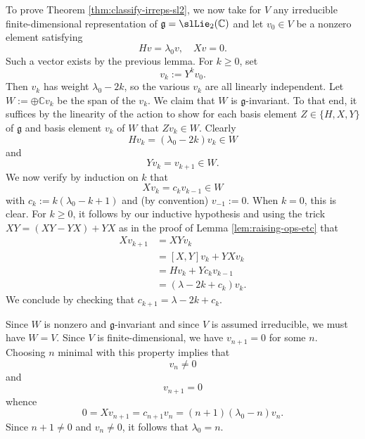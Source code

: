 \documentclass[reqno]{amsart} 
\begin{document}
To prove Theorem \ref{thm:classify-irreps-sl2},
we now take for $V$ any irreducible finite-dimensional
representation
of $\mathfrak{g} = \slLie_2(\mathbb{C})$
and let $v_0 \in V$ be a nonzero element
satisfying
\begin{equation*}
  H v = \lambda_0 v,
  \quad X v = 0.
\end{equation*}
Such a vector exists by the previous lemma.
For $k \geq 0$,
set
\begin{equation*}
  v_k := Y^k v_0.
\end{equation*}
Then $v_k$ has weight $\lambda_0 - 2k$,
so the various $v_k$ are all linearly independent.
Let $W := \oplus \mathbb{C} v_k$ be the span of the $v_k$.
We claim that $W$ is $\mathfrak{g}$-invariant.
To that end, it suffices by the linearity
of the action to show
for each basis element $Z \in \{H,X,Y\}$ of $\mathfrak{g}$
and basis element $v_k$ of $W$
that $Z v_k \in W$.
Clearly
\begin{equation*}
  H v_k = (\lambda_0 - 2 k) v_k \in W
\end{equation*}
and
\begin{equation*}
  Y v_k = v_{k+1} \in W.
\end{equation*}
We now verify by induction on $k$ that
\begin{equation*}
  X v_k = c_k v_{k-1} \in W
\end{equation*}
with $c_k := k(\lambda_0 - k + 1)$
and (by convention) $v_{-1} := 0$.
When $k = 0$, this is clear.
For $k \geq 0$,
it follows by our inductive hypothesis
and using the trick $X Y = (X Y - Y X) + Y X$
as in  the proof of Lemma \ref{lem:raising-ops-etc}
that
\begin{align*}
  X v_{k+1}
  &=
    X Y v_k
  \\
  &=
    [X,Y] v_k + Y X v_k
  \\
  &=
    H v_k + Y c_k v_{k-1}
  \\
  &= (\lambda - 2k + c_k) v_k.
\end{align*}
We conclude by
checking that $c_{k+1} =\lambda - 2k + c_k$.

Since $W$ is nonzero and $\mathfrak{g}$-invariant
and since $V$ is assumed irreducible,
we must have $W = V$.
Since $V$ is finite-dimensional,
we have $v_{n+1} = 0$ for some $n$.
Choosing $n$ minimal with this property
implies that
\begin{equation*}
  v_n \neq 0
\end{equation*}
and
\begin{equation*}
  v_{n+1} = 0
\end{equation*}
whence
\begin{equation*}
  0 = X v_{n+1}
  = c_{n+1} v_n
  = (n+1)(\lambda_0 - n) v_n.
\end{equation*}
Since $n+1 \neq 0$ and $v_n \neq 0$,
it follows that $\lambda_0 = n$.
\end{document}
